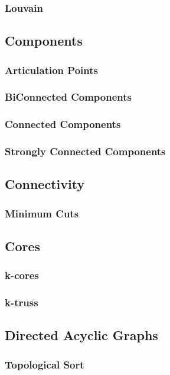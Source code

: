 \subsubsection{Louvain}

\subsection{Components}
\subsubsection{Articulation Points}
\subsubsection{BiConnected Components}
\subsubsection{Connected Components}
\subsubsection{Strongly Connected Components}

\subsection{Connectivity}
\subsubsection{Minimum Cuts}

\subsection{Cores}
\subsubsection{k-cores}
\subsubsection{k-truss}

\subsection{Directed Acyclic Graphs}
\subsubsection{Topological Sort}
